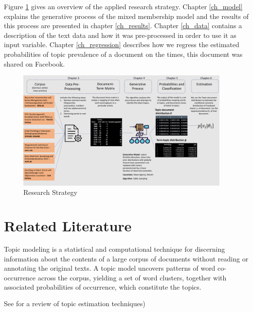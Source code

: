 \documentclass[12pt,a4paper,notitlepage]{article}
\begin{document}
Figure \ref{fig_research_strat} gives an overview of the applied research strategy. Chapter \ref{ch_model} explains the generative process of the mixed membership model and the results of this process are presented in chapter \ref{ch_results}. Chapter \ref{ch_data} contains a description of the text data and how it was pre-processed in order to use it as input variable.  Chapter \ref{ch_regression} describes how we regress the estimated probabilities of topic prevalence of a document on the times, this document was shared on Facebook.

\begin{figure}[ht]
	\centering
	\includegraphics[width=0.95\textwidth]{../figs/research_strategy.pdf} 
	\caption{Research Strategy}
	\label{fig_research_strat}
\end{figure}


\section{Related Literature}




Topic modeling is a statistical and computational technique for discerning information about the contents of a large corpus of documents without reading or annotating the original texts. A topic model uncovers patterns of word co-occurrence across the corpus, yielding a set of word clusters, together with associated probabilities of occurrence, which constitute the topics.

See \citep{taddy_estimation_2012} for a review of topic estimation techniques)
\end{document}
